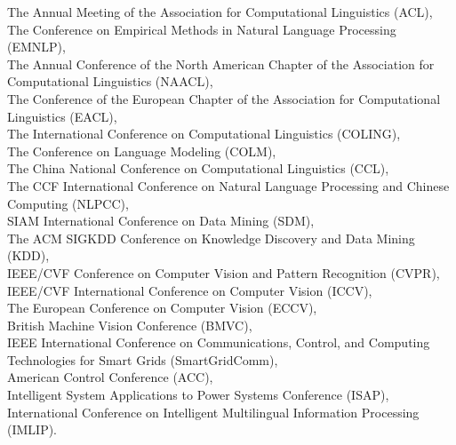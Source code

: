 \documentclass[10pt]{article}
\renewcommand{\section}[1]{\pagebreak[3]%
    \hyphenpenalty=10000%
    \vspace{1.3\baselineskip}%
    \phantomsection\addcontentsline{toc}{section}{#1}%
    \noindent\llap{\scshape\smash{\parbox[t]{\marginparwidth}{\raggedright #1}}}%
    \vspace{-\baselineskip}\par}
\newenvironment{innerlist}[1][\enskip\textbullet]%
        {\begin{itemize}[#1,leftmargin=*,parsep=0pt,itemsep=0pt,topsep=0pt,partopsep=0pt]}
        {\end{itemize}}
\newcommand{\halfblankline}{\quad\vspace{-0.5\baselineskip}\pagebreak[3]}
\begin{document}
\begin{innerlist}
The Annual Meeting of the Association for Computational Linguistics (ACL), \\
The Conference on Empirical Methods in Natural Language Processing (EMNLP), \\
The Annual Conference of the North American Chapter of the Association for Computational Linguistics (NAACL), \\
The Conference of the European Chapter of the Association for Computational Linguistics (EACL), \\
The International Conference on Computational Linguistics (COLING), \\
The Conference on Language Modeling (COLM), \\
The China National Conference on Computational Linguistics (CCL), \\
The CCF International Conference on Natural Language Processing and Chinese Computing (NLPCC), \\
SIAM International Conference on Data Mining (SDM), \\
The ACM SIGKDD Conference on Knowledge Discovery and Data Mining (KDD), \\
IEEE/CVF Conference on Computer Vision and Pattern Recognition (CVPR), \\
IEEE/CVF International Conference on Computer Vision (ICCV), \\
The European Conference on Computer Vision (ECCV), \\
British Machine Vision Conference (BMVC), \\
IEEE International Conference on Communications, Control, and Computing Technologies for Smart Grids (SmartGridComm), \\
American Control Conference (ACC), \\
Intelligent System Applications to Power Systems Conference (ISAP), \\
International Conference on Intelligent Multilingual Information Processing (IMLIP).


\end{innerlist}

%

\end{document}
